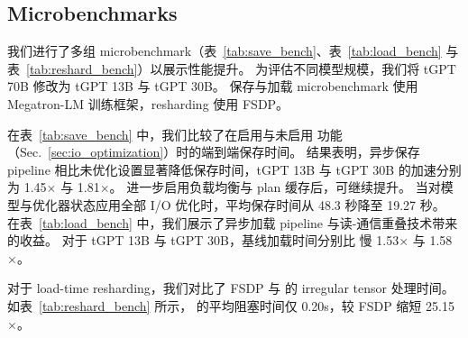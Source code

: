 \begin{table}[!t]
\caption{\sys{} 在大规模 LFM 训练中的 I/O 性能。}
\label{tab:io_product}
\begin{small}
\end{small}
\end{table}

\subsection{Microbenchmarks}
我们进行了多组 microbenchmark（表~\ref{tab:save_bench}、表~\ref{tab:load_bench} 与表~\ref{tab:reshard_bench}）以展示性能提升。
为评估不同模型规模，我们将 tGPT 70B 修改为 tGPT 13B 与 tGPT 30B。
保存与加载 microbenchmark 使用 Megatron-LM 训练框架，resharding 使用 FSDP。

在表~\ref{tab:save_bench} 中，我们比较了在启用与未启用 \sys{} 功能（Sec.~\ref{sec:io_optimization}）时的端到端保存时间。
结果表明，异步保存 pipeline 相比未优化设置显著降低保存时间，tGPT 13B 与 tGPT 30B 的加速分别为 1.45$\times$ 与 1.81$\times$。
进一步启用负载均衡与 plan 缓存后，可继续提升。
当对模型与优化器状态应用全部 I/O 优化时，平均保存时间从 48.3 秒降至 19.27 秒。
在表~\ref{tab:load_bench} 中，我们展示了异步加载 pipeline 与读-通信重叠技术带来的收益。
对于 tGPT 13B 与 tGPT 30B，基线加载时间分别比 \sys{} 慢 1.53$\times$ 与 1.58$\times$。

对于 load-time resharding，我们对比了 FSDP 与 \sys{} 的 irregular tensor 处理时间。
如表~\ref{tab:reshard_bench} 所示，\sys{} 的平均阻塞时间仅 0.20s，较 FSDP 缩短 25.15$\times$。
